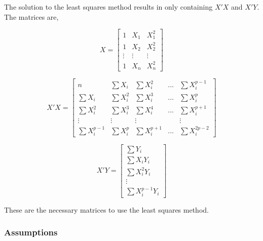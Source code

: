  \noindent The solution to the least squares method results in only containing $X'X$ and $X'Y$.
 The matrices are,
 
 
\begin{equation}
 X=
 \left[
 \begin{array}{ccc}
 	1 &X_1	& X_1^2\\ 
 	1 & X_2 & X_2^2	\\
 	\vdots & \vdots & \vdots \\
 	1 & X_n& X_n^2
 \end{array}
 \right]
\end{equation}
 
 \begin{equation}
 	X'X=
 \left[
 \begin{array}{ccccc}
 	n &\sum X_i	& \sum X_i^2 & ... &\sum X_i^{p-1}\\ 
 	\sum X_i & \sum X_i^2 & \sum X_i^3&...& \sum X_i^p	\\
 	\sum X_i^2 & \sum X_i^3 & \sum X_i^4 & ... & \sum X_i^{p+1}\\
 	\vdots&\vdots&\vdots& & \vdots	\\
 	\sum X_i^{p-1} &\sum X_i^p& \sum X_i^{p+1} & ... & \sum X_i^{2p-2}
 \end{array}
 \right]
\end{equation}
 
 \begin{equation}
 	X' Y=
 \left[
 \begin{array}{c}
 	\sum Y_i\\ 
 	\sum X_i Y_i	\\
 	\sum X_i^2 Y_i \\
 	\vdots	\\
 	\sum X_i^{p-1} Y_i
 \end{array}
 \right]
\end{equation}
 
 \noindent These are the necessary matrices to use the least squares method.

	\subsubsection{Assumptions}
	